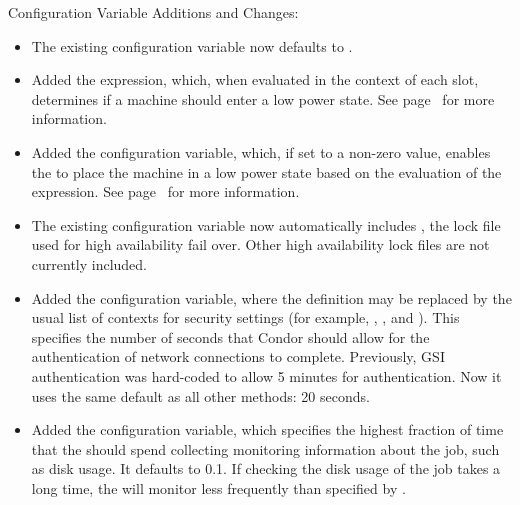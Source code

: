 \noindent Configuration Variable Additions and Changes:

\begin{itemize}

\item The existing  configuration variable
  now defaults to .

\item Added the  expression, which, when evaluated in
  the context of each slot, determines if a machine should enter
  a low power state. See page~\pageref{param:Hibernate} for more 
  information.

\item Added the  configuration variable,
  which, if set to a non-zero value, enables the  to place the 
  machine in a low power state based on the evaluation of the
   expression.  See 
  page~\pageref{param:HibernateCheckInterval} for more information.

\item The existing  configuration variable
  now automatically includes ,
  the lock file used for high availability  fail over.
  Other high availability lock files are not currently included.

\item Added the  configuration
  variable, where the definition  may be replaced
  by the usual list of contexts for security settings
  (for example, , , and ).
  This specifies the number of seconds that Condor should
  allow for the authentication of network connections to complete.
  Previously, GSI authentication was hard-coded to allow 5 minutes
  for authentication.
  Now it uses the same default as all other methods: 20 seconds.

\item Added the  configuration
  variable, which
  specifies the highest fraction of time that the  should spend
  collecting monitoring information about the job, such as disk usage.
  It defaults to 0.1.  If checking the disk usage of the job takes a
  long time, the  will monitor less frequently than 
  specified by .

\end{itemize}

